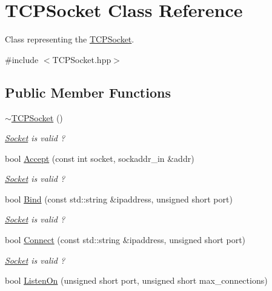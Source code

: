 \hypertarget{class_t_c_p_socket}{}\section{T\+C\+P\+Socket Class Reference}
\label{class_t_c_p_socket}


Class representing the \hyperlink{class_t_c_p_socket}{T\+C\+P\+Socket}.  




{\ttfamily \#include $<$T\+C\+P\+Socket.\+hpp$>$}

\subsection*{Public Member Functions}
\begin{DoxyCompactItemize}
\item 
\hyperlink{class_t_c_p_socket_af357e6923a0f8adbbb8e46fab4523991}{$\sim$\+T\+C\+P\+Socket} ()
\begin{DoxyCompactList}\small\item\em \hyperlink{class_socket}{Socket} is valid ? \end{DoxyCompactList}\item 
bool \hyperlink{class_t_c_p_socket_a3b6b62c9fc568585dc62f2763455a058}{Accept} (const int socket, sockaddr\+\_\+in \&addr)
\begin{DoxyCompactList}\small\item\em \hyperlink{class_socket}{Socket} is valid ? \end{DoxyCompactList}\item 
bool \hyperlink{class_t_c_p_socket_ace5b4e24ee632208ccc5edc74dd151c9}{Bind} (const std\+::string \&ipaddress, unsigned short port)
\begin{DoxyCompactList}\small\item\em \hyperlink{class_socket}{Socket} is valid ? \end{DoxyCompactList}\item 
bool \hyperlink{class_t_c_p_socket_ac816c30175550d8d9a14c89c1c5ec8da}{Connect} (const std\+::string \&ipaddress, unsigned short port)
\begin{DoxyCompactList}\small\item\em \hyperlink{class_socket}{Socket} is valid ? \end{DoxyCompactList}\item 
bool \hyperlink{class_t_c_p_socket_aef6184730320c1336600f6cab1546a38}{Listen\+On} (unsigned short port, unsigned short max\+\_\+connections)

\end{DoxyCompactItemize}
